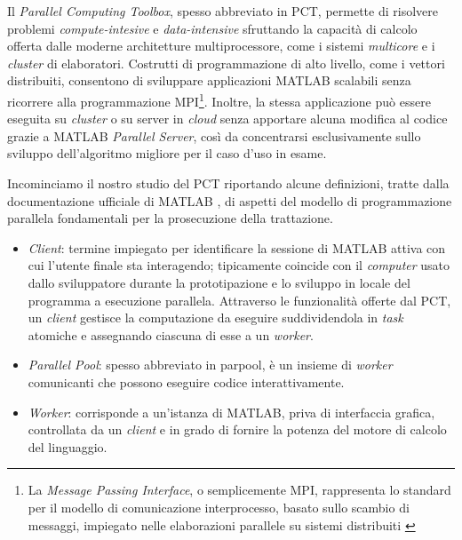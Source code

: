 \nocite{MathWorksParallelComputing}
Il \textit{Parallel Computing Toolbox}, spesso abbreviato in PCT, permette di risolvere problemi \textit{compute-intesive} e  \textit{data-intensive} sfruttando 
la capacit\`a di calcolo offerta dalle moderne architetture multiprocessore, come i sistemi \textit{multicore} e i \textit{cluster} di elaboratori. \newline
Costrutti di programmazione di alto livello, come i vettori distribuiti, consentono di sviluppare applicazioni MATLAB scalabili senza ricorrere alla programmazione 
MPI\footnote{La \textit{Message Passing Interface}, o semplicemente MPI, rappresenta lo standard per il modello di comunicazione interprocesso, basato sullo scambio 
di messaggi, impiegato nelle elaborazioni parallele su sistemi distribuiti \cite{NMSUMPIIntro}}.\newline
Inoltre, la stessa applicazione pu\`o essere eseguita su \textit{cluster} o su server in \textit{cloud} senza apportare alcuna modifica al codice grazie a MATLAB 
\textit{Parallel Server}, cos\`i da concentrarsi esclusivamente sullo sviluppo dell'algoritmo migliore per il caso d'uso in esame.

Incominciamo il nostro studio del PCT riportando alcune definizioni, tratte dalla documentazione ufficiale di MATLAB \cite{MathWorksWhatIsParallel}, di aspetti del modello di programmazione parallela fondamentali per la prosecuzione della trattazione.
\begin{itemize}
\item \textit{Client}: termine impiegato per identificare la sessione di MATLAB attiva con cui l'utente finale sta interagendo; tipicamente coincide con il 
\textit{computer} usato dallo sviluppatore durante la prototipazione e lo sviluppo in locale del programma a esecuzione parallela.\newline
Attraverso le funzionalit\`a offerte dal PCT, un \textit{client} gestisce la computazione da eseguire suddividendola in  \textit{task} atomiche e assegnando ciascuna 
di esse a un \textit{worker}.
\item \textit{Parallel Pool}: spesso abbreviato in parpool, \`e un insieme di \textit{worker} comunicanti che possono eseguire codice interattivamente.
\item \textit{Worker}: corrisponde a un'istanza di MATLAB, priva di interfaccia grafica, controllata da un \textit{client} e in grado di fornire la potenza del 
motore di calcolo del linguaggio.
\end{itemize}

